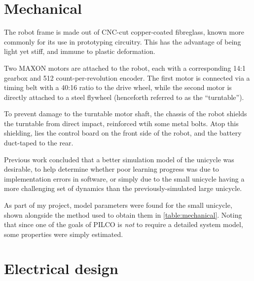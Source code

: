 \documentclass[main.tex]{subfiles}
\begin{document}
\section{Mechanical}

	The robot frame is made out of CNC-cut copper-coated fibreglass, known more commonly for its use in prototyping circuitry.
	This has the advantage of being light yet stiff, and immune to plastic deformation.

	Two MAXON motors\cite{motor} are attached to the robot, each with a corresponding 14:1 gearbox\cite{gearbox} and 512 count-per-revolution encoder\cite{encoder}.
	The first motor is connected via a timing belt with a 40:16 ratio to the drive wheel, while the second motor is directly attached to a steel flywheel (henceforth referred to as the \enquote{turntable}).

	To prevent damage to the turntable motor shaft, the chassis of the robot shields the turntable from direct impact, reinforced wtih some metal bolts.
	Atop this shielding, lies the control board on the front side of the robot, and the battery duct-taped to the rear.

	Previous work concluded \cite[p.~54]{aleksi} that a better simulation model of the unicycle was desirable, to help determine whether poor learning progress was due to implementation errors in software, or simply due to the small unicycle having a more challenging set of dynamics than the previously-simulated large unicycle.

	As part of my project, model parameters were found for the small unicycle, shown alongside the method used to obtain them in \cref{table:mechanical}.
	Noting that since one of the goals of PILCO is \emph{not} to require a detailed system model, some properties were simply estimated.

	\begin{table}
		
		\label{table:mechanical}
	\end{table}



\section{Electrical design}
\end{document}
